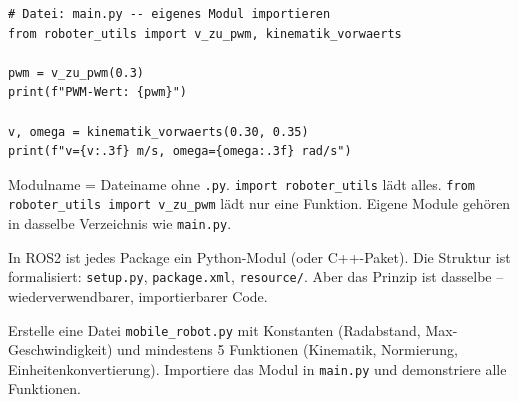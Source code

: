 \begin{lstlisting}
# Datei: main.py -- eigenes Modul importieren
from roboter_utils import v_zu_pwm, kinematik_vorwaerts

pwm = v_zu_pwm(0.3)
print(f"PWM-Wert: {pwm}")

v, omega = kinematik_vorwaerts(0.30, 0.35)
print(f"v={v:.3f} m/s, omega={omega:.3f} rad/s")
\end{lstlisting}

\begin{merksatz}
Modulname = Dateiname ohne \texttt{.py}. \texttt{import roboter\_utils} lädt alles. \texttt{from roboter\_utils import v\_zu\_pwm} lädt nur eine Funktion. Eigene Module gehören in dasselbe Verzeichnis wie \texttt{main.py}.
\end{merksatz}

\begin{ros}
In ROS2 ist jedes Package ein Python-Modul (oder C++-Paket). Die Struktur ist formalisiert: \texttt{setup.py}, \texttt{package.xml}, \texttt{resource/}. Aber das Prinzip ist dasselbe -- wiederverwendbarer, importierbarer Code.
\end{ros}

\begin{uebung}[title=Projektaufgabe Modul 8: Roboter-Modul]
Erstelle eine Datei \texttt{mobile\_robot.py} mit Konstanten (Radabstand, Max-Geschwindigkeit) und mindestens 5 Funktionen (Kinematik, Normierung, Einheitenkonvertierung). Importiere das Modul in \texttt{main.py} und demonstriere alle Funktionen.
\end{uebung}
